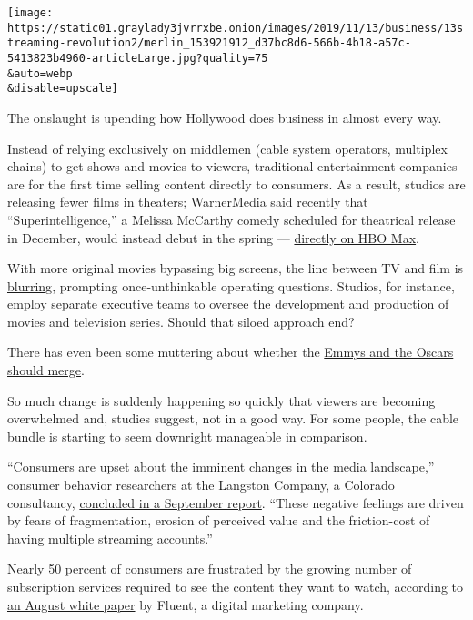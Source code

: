 \texttt{[image: https://static01.graylady3jvrrxbe.onion/images/2019/11/13/business/13streaming-revolution2/merlin\_153921912\_d37bc8d6-566b-4b18-a57c-5413823b4960-articleLarge.jpg?quality=75\\\&auto=webp\\\&disable=upscale]}

The onslaught is upending how Hollywood does business in almost every
way.

Instead of relying exclusively on middlemen (cable system operators,
multiplex chains) to get shows and movies to viewers, traditional
entertainment companies are for the first time selling content directly
to consumers. As a result, studios are releasing fewer films in
theaters; WarnerMedia said recently that ``Superintelligence,'' a
Melissa McCarthy comedy scheduled for theatrical release in December,
would instead debut in the spring ---
\href{https://www.forbes.com/sites/scottmendelson/2019/10/17/melissa-mccarthy-superintelligence-hbo-max-warner-bros-adam-sandler-netflix-kevin-hart-andy-serkis/\#18ba41f0321c}{directly
on HBO Max}.

With more original movies bypassing big screens, the line between TV and
film is
\href{https://www.cnn.com/2019/08/26/entertainment/streaming-wars-column/index.html}{blurring},
prompting once-unthinkable operating questions. Studios, for instance,
employ separate executive teams to oversee the development and
production of movies and television series. Should that siloed approach
end?

There has even been some muttering about whether the
\href{https://www.hollywoodreporter.com/news/as-lines-between-film-tv-blur-academies-should-merge-1222139}{Emmys
and the Oscars should merge}.

So much change is suddenly happening so quickly that viewers are
becoming overwhelmed and, studies suggest, not in a good way. For some
people, the cable bundle is starting to seem downright manageable in
comparison.

``Consumers are upset about the imminent changes in the media
landscape,'' consumer behavior researchers at the Langston Company, a
Colorado consultancy,
\href{https://thelangstonco.com/langston-streaming-study}{concluded in a
September report}. ``These negative feelings are driven by fears of
fragmentation, erosion of perceived value and the friction-cost of
having multiple streaming accounts.''

Nearly 50 percent of consumers are frustrated by the growing number of
subscription services required to see the content they want to watch,
according to
\href{https://www.fluentco.com/resources/streaming-services-whitepaper/}{an
August white paper} by Fluent, a digital marketing company.

